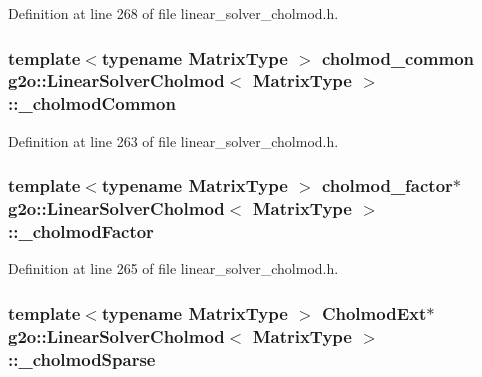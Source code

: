 Definition at line 268 of file linear\+\_\+solver\+\_\+cholmod.\+h.

\subsubsection[{\texorpdfstring{\+\_\+cholmod\+Common}{_cholmodCommon}}]{\setlength{\rightskip}{0pt plus 5cm}template$<$typename Matrix\+Type $>$ cholmod\+\_\+common {\bf g2o\+::\+Linear\+Solver\+Cholmod}$<$ Matrix\+Type $>$\+::\+\_\+cholmod\+Common\hspace{0.3cm}{\ttfamily [protected]}}\hypertarget{classg2o_1_1LinearSolverCholmod_ae7def9c6bf341e0d2f3a3936121fefa1}{}\label{classg2o_1_1LinearSolverCholmod_ae7def9c6bf341e0d2f3a3936121fefa1}


Definition at line 263 of file linear\+\_\+solver\+\_\+cholmod.\+h.

\subsubsection[{\texorpdfstring{\+\_\+cholmod\+Factor}{_cholmodFactor}}]{\setlength{\rightskip}{0pt plus 5cm}template$<$typename Matrix\+Type $>$ cholmod\+\_\+factor$\ast$ {\bf g2o\+::\+Linear\+Solver\+Cholmod}$<$ Matrix\+Type $>$\+::\+\_\+cholmod\+Factor\hspace{0.3cm}{\ttfamily [protected]}}\hypertarget{classg2o_1_1LinearSolverCholmod_a674a54287f98130c4aab303508ab945b}{}\label{classg2o_1_1LinearSolverCholmod_a674a54287f98130c4aab303508ab945b}


Definition at line 265 of file linear\+\_\+solver\+\_\+cholmod.\+h.

\subsubsection[{\texorpdfstring{\+\_\+cholmod\+Sparse}{_cholmodSparse}}]{\setlength{\rightskip}{0pt plus 5cm}template$<$typename Matrix\+Type $>$ {\bf Cholmod\+Ext}$\ast$ {\bf g2o\+::\+Linear\+Solver\+Cholmod}$<$ Matrix\+Type $>$\+::\+\_\+cholmod\+Sparse\hspace{0.3cm}{\ttfamily [protected]}}\hypertarget{classg2o_1_1LinearSolverCholmod_aefbdba58c18dc9eac831eb3d7c24fa18}{}\label{classg2o_1_1LinearSolverCholmod_aefbdba58c18dc9eac831eb3d7c24fa18}


